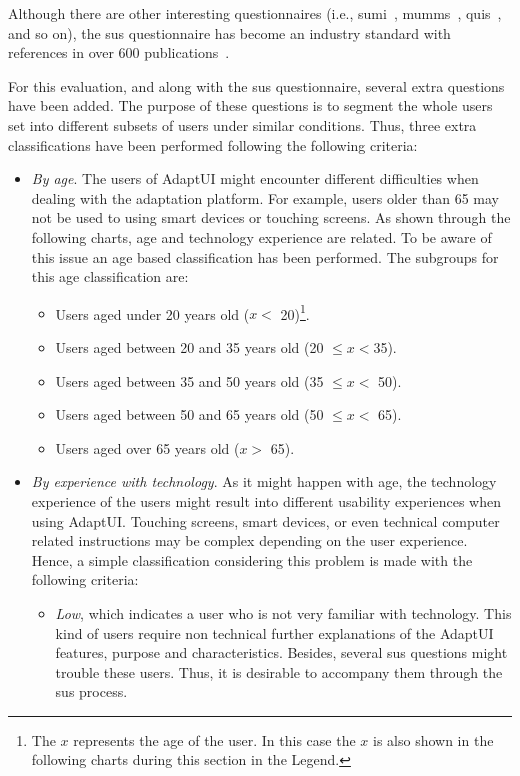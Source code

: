 Although there are other interesting questionnaires (i.e., \ac{sumi}~\citep{sumi},
\ac{mumms}~\citep{mumms}, \ac{quis}~\citep{quis}, and so on), the \ac{sus} 
questionnaire has become an industry standard with references in over 600 
publications~\citep{measuringusability}.

For this evaluation, and along with the \ac{sus} questionnaire, several extra 
questions have been added. The purpose of these questions is to segment the 
whole users set into different subsets of users under similar conditions. Thus, 
three extra classifications have been performed following the following 
criteria:

\begin{itemize}
  \item \textit{By age}. The users of AdaptUI might encounter different difficulties when
  dealing with the adaptation platform. For example, users older than 65 may not
  be used to using smart devices or touching screens. As shown through the 
  following charts, age and technology experience are related. To be aware of
  this issue an age based classification has been performed. The subgroups for
  this age classification are:
  \begin{itemize}
    \item Users aged under 20 years old ($x <$ 20)\footnote{The $x$ represents
    the age of the user. In this case the $x$ is also shown in the following 
charts
    during this section in the Legend.}.
    \item Users aged between 20 and 35 years old (20 $\leq x < $35).
    \item Users aged between 35 and 50 years old (35 $\leq x <$ 50).
    \item Users aged between 50 and 65 years old (50 $\leq x <$ 65).
    \item Users aged over 65 years old ($x >$ 65).
  \end{itemize}

  \item \textit{By experience with technology}. As it might happen with age, the 
  technology experience of the users might result into different usability 
  experiences when using AdaptUI. Touching screens, smart devices, or even 
  technical computer related instructions may be complex depending on the user 
  experience. Hence, a simple classification considering this problem is made 
  with the following criteria:
  
  \begin{itemize}
    \item \textit{Low}, which indicates a user who is not very familiar with 
    technology. This kind of users require non technical further explanations of 
    the AdaptUI features, purpose and characteristics. Besides, several \ac{sus} 
    questions might trouble these users. Thus, it is desirable to accompany them 
    through the \ac{sus} process.
  

\end{itemize}
\end{itemize}
